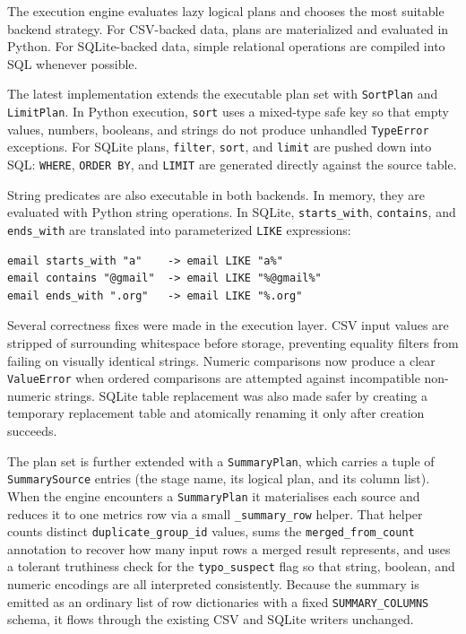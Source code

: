 The execution engine evaluates lazy logical plans and chooses the most suitable
backend strategy. For CSV-backed data, plans are materialized and evaluated in
Python. For SQLite-backed data, simple relational operations are compiled into
SQL whenever possible.

The latest implementation extends the executable plan set with
\texttt{SortPlan} and \texttt{LimitPlan}. In Python execution, \texttt{sort}
uses a mixed-type safe key so that empty values, numbers, booleans, and strings
do not produce unhandled \texttt{TypeError} exceptions. For SQLite plans,
\texttt{filter}, \texttt{sort}, and \texttt{limit} are pushed down into SQL:
\texttt{WHERE}, \texttt{ORDER BY}, and \texttt{LIMIT} are generated directly
against the source table.

String predicates are also executable in both backends. In memory, they are
evaluated with Python string operations. In SQLite, \texttt{starts\_with},
\texttt{contains}, and \texttt{ends\_with} are translated into parameterized
\texttt{LIKE} expressions:

\begin{lstlisting}[style=dsl]
email starts_with "a"    -> email LIKE "a%"
email contains "@gmail"  -> email LIKE "%@gmail%"
email ends_with ".org"   -> email LIKE "%.org"
\end{lstlisting}

Several correctness fixes were made in the execution layer. CSV input values
are stripped of surrounding whitespace before storage, preventing equality
filters from failing on visually identical strings. Numeric comparisons now
produce a clear \texttt{ValueError} when ordered comparisons are attempted
against incompatible non-numeric strings. SQLite table replacement was also
made safer by creating a temporary replacement table and atomically renaming it
only after creation succeeds.

The plan set is further extended with a \texttt{SummaryPlan}, which carries a
tuple of \texttt{SummarySource} entries (the stage name, its logical plan, and
its column list). When the engine encounters a \texttt{SummaryPlan} it
materialises each source and reduces it to one metrics row via a small
\texttt{\_summary\_row} helper. That helper counts distinct
\texttt{duplicate\_group\_id} values, sums the \texttt{merged\_from\_count}
annotation to recover how many input rows a merged result represents, and uses a
tolerant truthiness check for the \texttt{typo\_suspect} flag so that string,
boolean, and numeric encodings are all interpreted consistently. Because the
summary is emitted as an ordinary list of row dictionaries with a fixed
\texttt{SUMMARY\_COLUMNS} schema, it flows through the existing CSV and SQLite
writers unchanged.

